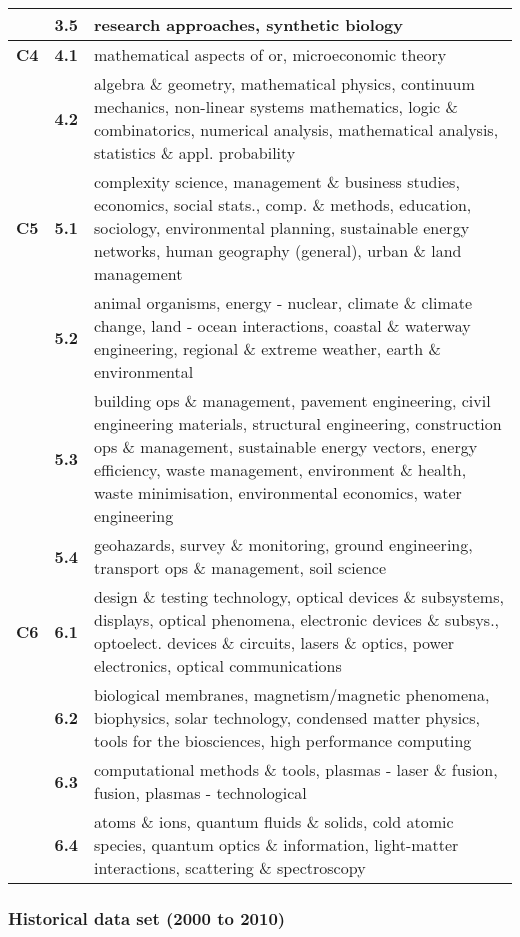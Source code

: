\begin{spacing}{0.9}
\begin{longtable}[r]{r|r|p{11.5cm}}
& \textbf{3.5} & {research approaches, synthetic biology}\\
\hline
\textbf{C4}
& \textbf{4.1} & {mathematical aspects of or, microeconomic theory}\\
& \textbf{4.2} & {algebra \& geometry, mathematical physics, continuum mechanics, non-linear systems mathematics, logic \& combinatorics, numerical analysis, mathematical analysis, statistics \& appl. probability}\\
\hline
\textbf{C5}
& \textbf{5.1} & {complexity science, management \& business studies, economics, social stats., comp. \& methods, education, sociology, environmental planning, sustainable energy networks, human geography (general), urban \& land management}\\
& \textbf{5.2} & {animal organisms, energy - nuclear, climate \& climate change, land - ocean interactions, coastal \& waterway engineering, regional \& extreme weather, earth \& environmental}\\
& \textbf{5.3} & {building ops \& management, pavement engineering, civil engineering materials, structural engineering, construction ops \& management, sustainable energy vectors, energy efficiency, waste management, environment \& health, waste minimisation, environmental economics, water engineering}\\
& \textbf{5.4} & {geohazards, survey \& monitoring, ground engineering, transport ops \& management, soil science}\\
\hline
\textbf{C6}
& \textbf{6.1} & {design \& testing technology, optical devices \& subsystems, displays, optical phenomena, electronic devices \& subsys., optoelect. devices \& circuits, lasers \& optics, power electronics, optical communications}\\
& \textbf{6.2} & {biological membranes, magnetism/magnetic phenomena, biophysics, solar technology, condensed matter physics, tools for the biosciences, high performance computing}\\
& \textbf{6.3} & {computational methods \& tools, plasmas - laser \& fusion, fusion, plasmas - technological}\\
& \textbf{6.4} & {atoms \& ions, quantum fluids \& solids, cold atomic species, quantum optics \& information, light-matter interactions, scattering \& spectroscopy}
\end{longtable}
\end{spacing}

\clearpage

\subsubsection{Historical data set (2000 to 2010)}


